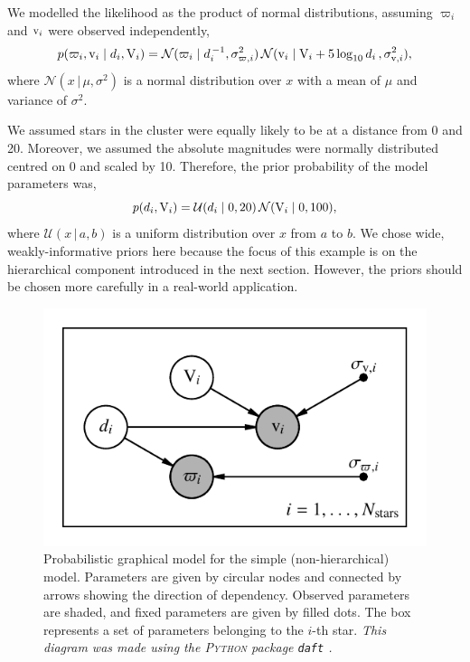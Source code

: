 We modelled the likelihood as the product of normal distributions, assuming \(\varpi_i\) and \(\mathrm{v}_i\) were observed independently,
%
\begin{equation}
    p(\varpi_i, \mathrm{v}_i \mid d_i, \mathrm{V}_i) = \mathcal{N}(\varpi_i \mid d_i^{\,-1}, \sigma_{\varpi, i}^2) \, \mathcal{N}(\mathrm{v}_i \mid \mathrm{V}_i + 5\log_{10}d_i \, , \sigma_{\mathrm{v}, i}^2),\label{eq:hbm-like}
\end{equation}
%
where \(\mathcal{N}(x \,|\, \mu, \sigma^2)\) is a normal distribution over \(x\) with a mean of \(\mu\) and variance of \(\sigma^2\).

We assumed stars in the cluster were equally likely to be at a distance from 0 and 20. Moreover, we assumed the absolute magnitudes were normally distributed centred on 0 and scaled by 10. Therefore, the prior probability of the model parameters was,
%
\begin{equation}
    p(d_i, \mathrm{V}_i) = \mathcal{U}(d_i \mid 0, 20) \, \mathcal{N}(\mathrm{V}_i \mid 0, 100),
\end{equation}
%
where \(\mathcal{U}(x \,|\, a, b)\) is a uniform distribution over \(x\) from \(a\) to \(b\). We chose wide, weakly-informative priors here because the focus of this example is on the hierarchical component introduced in the next section. However, the priors should be chosen more carefully in a real-world application.

\begin{figure}[tb]
    \centering
    \includegraphics{figures/simple-pgm.pdf}
    \caption[Probabilistic graphical model for the simple (non-hierarchical) model]{Probabilistic graphical model for the simple (non-hierarchical) model. Parameters are given by circular nodes and connected by arrows showing the direction of dependency. Observed parameters are shaded, and fixed parameters are given by filled dots. The box represents a set of parameters belonging to the \(i\)-th star. \emph{This diagram was made using the \textsc{Python} package \texttt{daft} \citep{Foreman-Mackey.Hogg.ea2021}.}}
    \label{fig:simple-pgm}
\end{figure}

